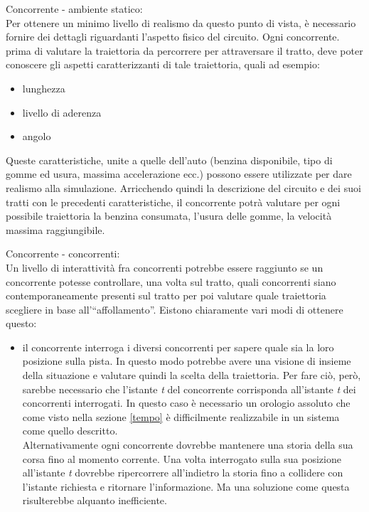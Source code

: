 \begin{description}
\item{Concorrente - ambiente statico:}\\
Per ottenere un minimo livello di realismo da questo punto di vista, è necessario fornire dei dettagli riguardanti l'aspetto fisico
del circuito. Ogni concorrente. prima di valutare la traiettoria da percorrere per attraversare il tratto, deve poter conoscere
gli aspetti caratterizzanti di tale traiettoria, quali ad esempio:
\begin{itemize}
\item lunghezza 
\item livello di aderenza
\item angolo
\end{itemize}
Queste caratteristiche, unite a quelle dell'auto (benzina disponibile, tipo di gomme ed usura, massima accelerazione ecc.)
possono essere utilizzate per dare realismo alla simulazione.
Arricchendo quindi la descrizione del circuito e dei suoi tratti con le precedenti caratteristiche, il concorrente potrà
valutare per ogni possibile traiettoria la benzina consumata, l'usura delle gomme, la velocità massima raggiungibile.
\item{Concorrente - concorrenti:}\\
Un livello di interattività fra concorrenti potrebbe essere raggiunto se 
un concorrente potesse controllare, una volta sul tratto, quali concorrenti siano contemporaneamente presenti sul tratto
per poi valutare quale traiettoria scegliere in base all'``affollamento''. Eistono chiaramente vari modi di ottenere questo:
\begin{itemize}
\item il concorrente interroga i diversi concorrenti per sapere quale sia la loro posizione sulla pista. In questo modo potrebbe
avere una visione di insieme della situazione e valutare quindi la scelta della traiettoria. Per fare ciò, però, sarebbe 
necessario che l'istante \emph{t} del concorrente corrisponda all'istante \emph{t} dei concorrenti interrogati. In questo caso
è necessario un orologio assoluto che come visto nella sezione \ref{tempo} è difficilmente realizzabile in un sistema come
quello descritto.\\
Alternativamente ogni concorrente dovrebbe mantenere una storia della sua corsa fino al momento corrente. Una volta interrogato
sulla sua posizione all'istante \emph{t} dovrebbe ripercorrere all'indietro la storia fino a collidere con l'istante richiesta
e ritornare l'informazione. Ma una soluzione come questa risulterebbe alquanto inefficiente.

\end{itemize}
\end{description}
